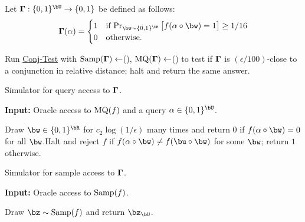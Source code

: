 \documentclass[11pt]{article}
\theoremstyle{definition}
\begin{document}
\begin{algorithm}
\begin{algorithmic}[1]
\Statex Let 
    $\bGamma : \{0,1\}^{\bU} \to \{0,1\}$ be defined as follows:
$$\bGamma(\alpha)=\begin{cases}
         1& \text{if $\Pr_{\bw \sim \{0,1\}^{\bR} }\big[f(\alpha \circ \bw) =1\big] \ge  1/16$} \\ 
         0 &\text{otherwise.}
    \end{cases}$$

    \State Run \hyperlink{Algorithm2}{\sc Conj-Test}
with $\mathrm{Samp}(\mathbf{\Gamma}) \leftarrow $(), $\mathrm{MQ}(\mathbf{\Gamma}) \leftarrow $()  to test if  
    $\mathbf{\Gamma}$ \Statex  is $(\epsilon/100)$-close to a conjunction in relative distance; halt and return the same answer. \vspace{0.15cm}
\end{algorithmic}
\end{algorithm}

\begin{algorithm}\caption{Simulator for query access to $\mathbf{\Gamma}$.}\label{algo:gamma_query} \textbf{Input: }Oracle access to $\mathrm{MQ}(f)$ and a query $\alpha \in \{0,1\}^{\bU}$. \\
    \begin{algorithmic}[1]
        \State Draw $\bw \in \{0,1\}^{\bR}$ for {$c_2\log(1/\epsilon)$} many times and return $0$ if $f(\alpha\circ \bw)=0$ for all $\bw$.\State Halt and reject $f$ if $f(\alpha \circ \bw) \neq f(\bu \circ \bw)$ for some $\bw$; return $1$ otherwise. 

    \end{algorithmic}
\end{algorithm}

\begin{algorithm}\caption{Simulator for sample access to $\mathbf{\Gamma}$.}\label{algo:gamma_sampler}
 \textbf{{Input: }}Oracle access to $\mathrm{Samp}(f)$. \\
    \begin{algorithmic}[1]
        \State Draw $\bz \sim \SAMP(f)$ and  
return $\bz_{\bU}$.
    \end{algorithmic}
\end{algorithm}
\end{document}
